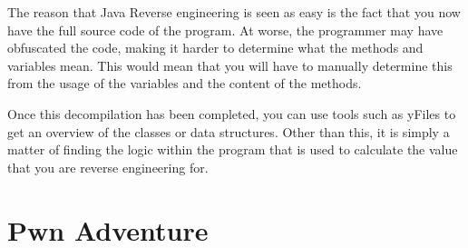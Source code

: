 		The reason that Java Reverse engineering is seen as easy is the fact that you now have the full source code of the program. 
		At worse, the programmer may have obfuscated the code, making it harder to determine what the methods and variables mean. 
		This would mean that you will have to manually determine this from the usage of the variables and the content of the methods.

		Once this decompilation has been completed, you can use tools such as yFiles to get an overview of the classes or data structures. 
		Other than this, it is simply a matter of finding the logic within the program that is used to calculate the value that you are reverse engineering for. 
	
	\section{Pwn Adventure}
